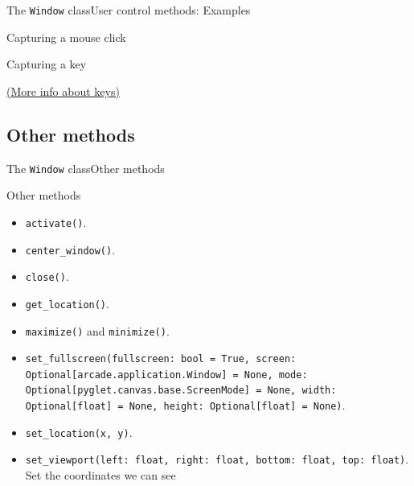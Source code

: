 \documentclass[10pt,compress]{beamer} %
\begin{document}
\begin{frame}[plain]{The \texttt{Window} class}{User control methods: Examples}

	\begin{exampleblock}{Capturing a mouse click}
		\vspace{-0.2cm}
		
		\vspace{-0.2cm}
	\end{exampleblock}

	\begin{exampleblock}{Capturing a key}
		\vspace{-0.2cm}
		
		\vspace{-0.2cm}
	\end{exampleblock}
	\href{https://api.arcade.academy/en/latest/arcade.key.html}{(More info about keys)}
\end{frame}

\subsection{Other methods}

\begin{frame}{The \texttt{Window} class}{Other methods}
	\begin{block}{Other methods}
		\begin{itemize}
		\item \footnotesize{\texttt{activate()}}. 
		\item \footnotesize{\texttt{center\_window()}}. 
		\item \footnotesize{\texttt{close()}}. 
		\item \footnotesize{\texttt{get\_location()}}. 
		\item \footnotesize{\texttt{maximize()} and \texttt{minimize()}}. 
		\item \footnotesize{\texttt{set\_fullscreen(fullscreen: bool = True, screen: Optional[arcade.application.Window] = None, mode: Optional[pyglet.canvas.base.ScreenMode] = None, width: Optional[float] = None, height: Optional[float] = None)}}. 
		\item \footnotesize{\texttt{set\_location(x, y)}}. 
		\item \footnotesize{\texttt{set\_viewport(left: float, right: float, bottom: float, top: float)}}. Set the coordinates we can see
		\end{itemize}
	\end{block}	
\end{frame}
\end{document}
